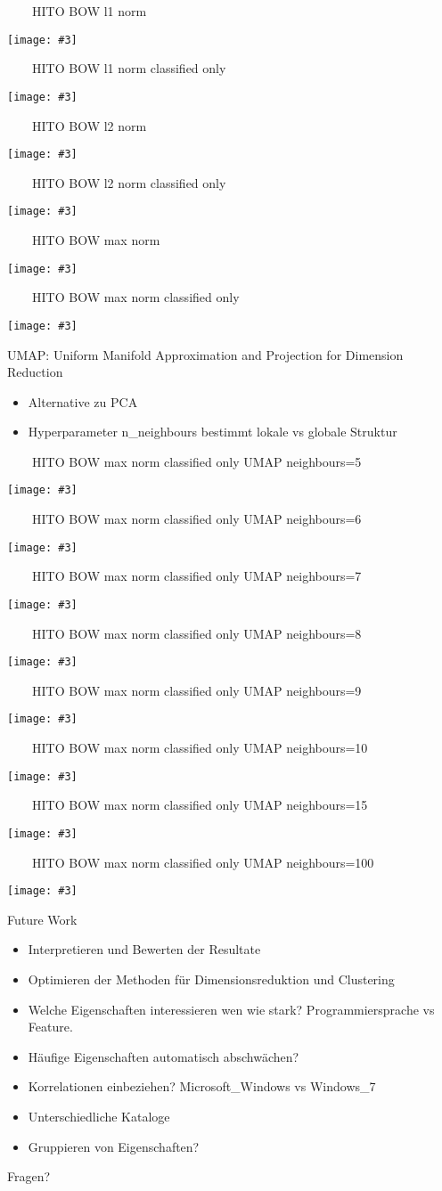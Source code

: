 \documentclass[aspectratio=1610]{beamer}
\newcommand{\imageslide}[4][]
{
\begin{frame}[plain]{~~~~#2}
\vspace{0.2em}
\begin{center}
\centering\texttt{[image: \#3]}
\end{center}
#1
\note{#4}
\end{frame}
}
\begin{document}
\imageslide{HITO BOW l1 norm}{img/cluster-bagofwords-l1.pdf}{}
\imageslide{HITO BOW l1 norm classified only}{img/cluster-bagofwords-classifiedonly-l1.pdf}{}
\imageslide{HITO BOW l2 norm}{img/cluster-bagofwords-l2.pdf}{}
\imageslide{HITO BOW l2 norm classified only}{img/cluster-bagofwords-classifiedonly-l2.pdf}{}
\imageslide{HITO BOW max norm}{img/cluster-bagofwords-max.pdf}{}
\imageslide{HITO BOW max norm classified only}{img/cluster-bagofwords-classifiedonly-max.pdf}{}

\begin{frame}{UMAP: Uniform Manifold Approximation and Projection for Dimension Reduction}
\begin{itemize}
\item Alternative zu PCA
\item Hyperparameter n\_neighbours bestimmt lokale vs globale Struktur
\end{itemize}
\end{frame}

\imageslide{HITO BOW max norm classified only UMAP neighbours=5}{img/cluster-bagofwords-classifiedonly-umap-n5-max.pdf}{}
\imageslide{HITO BOW max norm classified only UMAP neighbours=6}{img/cluster-bagofwords-classifiedonly-umap-n6-max.pdf}{}
\imageslide{HITO BOW max norm classified only UMAP neighbours=7}{img/cluster-bagofwords-classifiedonly-umap-n7-max.pdf}{}
\imageslide{HITO BOW max norm classified only UMAP neighbours=8}{img/cluster-bagofwords-classifiedonly-umap-n8-max.pdf}{}
\imageslide{HITO BOW max norm classified only UMAP neighbours=9}{img/cluster-bagofwords-classifiedonly-umap-n9-max.pdf}{}
\imageslide{HITO BOW max norm classified only UMAP neighbours=10}{img/cluster-bagofwords-classifiedonly-umap-n10-max.pdf}{}
\imageslide{HITO BOW max norm classified only UMAP neighbours=15}{img/cluster-bagofwords-classifiedonly-umap-max.pdf}{}
\imageslide{HITO BOW max norm classified only UMAP neighbours=100}{img/cluster-bagofwords-classifiedonly-umap-n100-max.pdf}{}

\begin{frame}{Future Work}
\begin{itemize}
\vspace{1em}
\item Interpretieren und Bewerten der Resultate
\pause
\item Optimieren der Methoden für Dimensionsreduktion und Clustering
\pause
\item Welche Eigenschaften interessieren wen wie stark? Programmiersprache vs Feature.
\pause
\item Häufige Eigenschaften automatisch abschwächen?
\pause
\item Korrelationen einbeziehen? Microsoft\_Windows vs Windows\_7
\pause
\item Unterschiedliche Kataloge
\pause
\item Gruppieren von Eigenschaften?
\end{itemize}
\end{frame}

\begin{frame}{Fragen?}
\end{frame}
\end{document}
